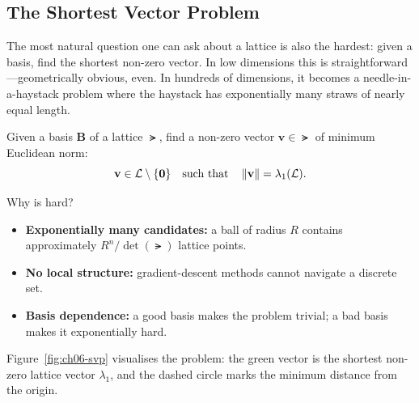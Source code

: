 \subsection{The Shortest Vector Problem}
\label{subsec:svp}

The most natural question one can ask about a lattice is also the hardest: given a basis, find the shortest non-zero vector.  In low dimensions this is straightforward---geometrically obvious, even.  In hundreds of dimensions, it becomes a needle-in-a-haystack problem where the haystack has exponentially many straws of nearly equal length.

\begin{definition}
\label{def:svp}
Given a basis $\mathbf{B}$ of a lattice $\lat$, find a non-zero vector $\mathbf{v}\in\lat$ of minimum Euclidean norm:
\begin{equation}
\mathbf{v} \in \mathcal{L}\setminus\{\mathbf{0}\} \quad\text{such that}\quad \left\lVert \mathbf{v} \right\rVert = \lambda_1(\mathcal{L}).
\end{equation}
\end{definition}

Why is \svp{} hard?
\begin{itemize}
\item \textbf{Exponentially many candidates:} a ball of radius $R$ contains approximately $R^n / \det(\lat)$ lattice points.
\item \textbf{No local structure:} gradient-descent methods cannot navigate a discrete set.
\item \textbf{Basis dependence:} a good basis makes the problem trivial; a bad basis makes it exponentially hard.
\end{itemize}

Figure~\ref{fig:ch06-svp} visualises the problem: the green vector is the shortest non-zero lattice vector $\lambda_1$, and the dashed circle marks the minimum distance from the origin.

